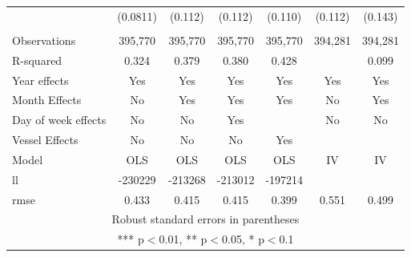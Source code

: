\begin{tabular}{lcccccc}
 & (0.0811) & (0.112) & (0.112) & (0.110) & (0.112) & (0.143) \\
 &  &  &  &  &  &  \\
Observations & 395,770 & 395,770 & 395,770 & 395,770 & 394,281 & 394,281 \\
R-squared & 0.324 & 0.379 & 0.380 & 0.428 &  & 0.099 \\
Year effects & Yes & Yes & Yes & Yes & Yes & Yes \\
Month Effects & No & Yes & Yes & Yes & No & Yes \\
Day of week effects & No & No & Yes &  & No & No \\
Vessel Effects & No & No & No & Yes &  &  \\
Model & OLS & OLS & OLS & OLS & IV & IV \\
ll & -230229 & -213268 & -213012 & -197214 &  &  \\
 rmse & 0.433 & 0.415 & 0.415 & 0.399 & 0.551 & 0.499 \\ \hline
\multicolumn{7}{c}{ Robust standard errors in parentheses} \\
\multicolumn{7}{c}{ *** p$<$0.01, ** p$<$0.05, * p$<$0.1} \\
\end{tabular}
